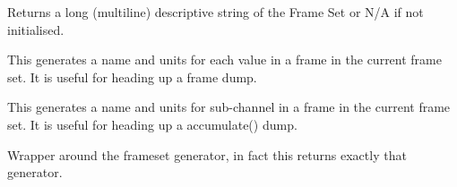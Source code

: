 \documentclass[letterpaper,10pt,english]{sphinxmanual}
\begin{document}
\begin{fulllineitems}
\begin{fulllineitems}
\end{fulllineitems}


\begin{fulllineitems}
\label{\detokenize{ref/LIS/core/LogPass:TotalDepth.LIS.core.LogPass.LogPass.frameSetLongStr}}
Returns a long (multiline) descriptive string of the Frame Set or N/A if not initialised.

\end{fulllineitems}


\begin{fulllineitems}
\label{\detokenize{ref/LIS/core/LogPass:TotalDepth.LIS.core.LogPass.LogPass.genFrameSetHeadings}}
This generates a name and units for each value in a frame in the
current frame set. It is useful for heading up a frame dump.

\end{fulllineitems}


\begin{fulllineitems}
\label{\detokenize{ref/LIS/core/LogPass:TotalDepth.LIS.core.LogPass.LogPass.genFrameSetScNameUnit}}
This generates a name and units for sub-channel in a frame in the
current frame set. It is useful for heading up a accumulate() dump.

\end{fulllineitems}


\begin{fulllineitems}
\label{\detokenize{ref/LIS/core/LogPass:TotalDepth.LIS.core.LogPass.LogPass.genOutpPoints}}
Wrapper around the frameset generator, in fact this returns exactly that generator.

\end{fulllineitems}



\end{fulllineitems}
\end{document}
